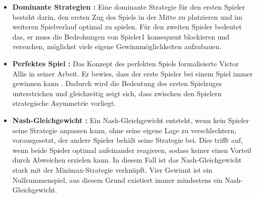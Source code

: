 \begin{itemize}
 
	 
	\item \textbf{Dominante Strategien :} Eine dominante Strategie für den ersten Spieler besteht darin, den ersten Zug des Spiels in der Mitte zu platzieren und im weiteren Spielverlauf optimal zu spielen. Für den zweiten Spieler bedeutet das, er muss die Bedrohungen von Spieler1 konsequent blockieren und versuchen, möglichst viele eigene Gewinnmöglichkeiten aufzubauen\autocite{cornell2015connect}. 
	
	
	\item \textbf{Perfektes Spiel :}
	Das Konzept des perfekten Spiels formalisierte Victor Allis in seiner Arbeit. Er bewies, dass der erste Spieler bei einem Spiel immer gewinnen kann \autocite{cornell2015connect}. Dadurch wird die Bedeutung des ersten Spielzuges unterstrichen und gleichzeitig zeigt sich, dass zwischen den Spielern strategische Asymmetrie vorliegt.
	


	\item \textbf{Nash-Gleichgewicht :} Ein Nash-Gleichgewicht entsteht, wenn kein Spieler seine Strategie anpassen kann, ohne seine eigene Lage zu verschlechtern, vorausgesetzt, der andere Spieler behält seine Strategie bei\autocite{Chen2024}. 
	Dies trifft auf, wenn beide Spieler optimal aufeinander reagieren, sodass keiner einen Vorteil durch Abweichen erzielen kann. In diesem Fall ist das Nash-Gleichgewicht stark mit der Minimax-Strategie verknüpft. Vier Gewinnt ist ein Nullsummenspiel, aus diesem Grund existiert immer mindestens ein Nash-Gleichgewicht\autocite{Cahn2024}.
\end{itemize}
